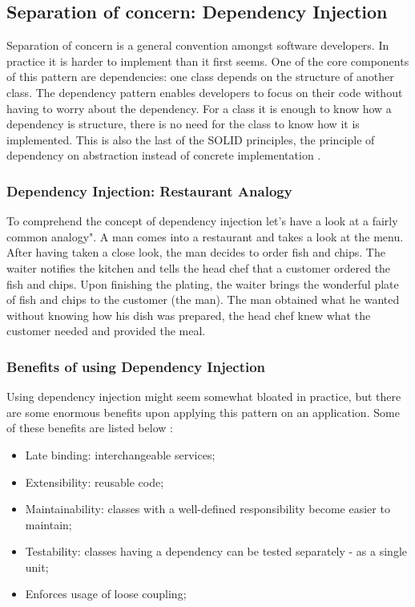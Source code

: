 \subsection{Separation of concern: Dependency Injection}
Separation of concern is a general convention amongst software developers. In practice it is harder to implement than it first seems. One of the core components of this pattern are dependencies: one class depends on the structure of another class. The dependency pattern enables developers to focus on their code without having to worry about the dependency. For a class it is enough to know how a dependency is structure, there is no need for the class to know how it is implemented. This is also the last of the SOLID principles, the principle of dependency on abstraction instead of concrete implementation \cite{BhavyaKaria2018}.
\subsubsection{Dependency Injection: Restaurant Analogy}
To comprehend the concept of dependency injection let's have a look at a fairly common analogy". A man comes into a restaurant and takes a look at the menu. After having taken a close look, the man decides to order fish and chips. The waiter notifies the kitchen and tells the head chef that a customer ordered the fish and chips. Upon finishing the plating, the waiter brings the wonderful plate of fish and chips to the customer (the man). The man obtained what he wanted without knowing how his dish was prepared, the head chef knew what the customer needed and provided the meal.
\subsubsection{Benefits of using Dependency Injection}
Using dependency injection might seem somewhat bloated in practice, but there are some enormous benefits upon applying this pattern on an application. Some of these benefits are listed below \cite{Seemann2011}:
\begin{itemize}
\item Late binding: interchangeable services;
\item Extensibility: reusable code;
\item Maintainability: classes with a well-defined responsibility become easier to maintain;
\item Testability: classes having a dependency can be tested separately - as a single unit; 
\item Enforces usage of loose coupling;
\end{itemize}
